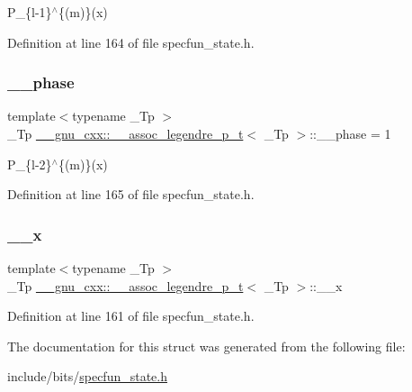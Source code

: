 P\+\_\+\{l-\/1\}$^\wedge$\{(m)\}(x) 



Definition at line 164 of file specfun\+\_\+state.\+h.

\mbox{\label{struct____gnu__cxx_1_1____assoc__legendre__p__t_ae4f6c562515b34a83b19f4998758f754}} 
\subsubsection{\texorpdfstring{\+\_\+\+\_\+phase}{\_\_phase}}
{\footnotesize\ttfamily template$<$typename \+\_\+\+Tp $>$ \\
\+\_\+\+Tp \hyperlink{struct____gnu__cxx_1_1____assoc__legendre__p__t}{\+\_\+\+\_\+gnu\+\_\+cxx\+::\+\_\+\+\_\+assoc\+\_\+legendre\+\_\+p\+\_\+t}$<$ \+\_\+\+Tp $>$\+::\+\_\+\+\_\+phase = 1}



P\+\_\+\{l-\/2\}$^\wedge$\{(m)\}(x) 



Definition at line 165 of file specfun\+\_\+state.\+h.

\mbox{\label{struct____gnu__cxx_1_1____assoc__legendre__p__t_a2de7db5bc670cc446e2a1ca92fd1a4d2}} 
\subsubsection{\texorpdfstring{\+\_\+\+\_\+x}{\_\_x}}
{\footnotesize\ttfamily template$<$typename \+\_\+\+Tp $>$ \\
\+\_\+\+Tp \hyperlink{struct____gnu__cxx_1_1____assoc__legendre__p__t}{\+\_\+\+\_\+gnu\+\_\+cxx\+::\+\_\+\+\_\+assoc\+\_\+legendre\+\_\+p\+\_\+t}$<$ \+\_\+\+Tp $>$\+::\+\_\+\+\_\+x}



Definition at line 161 of file specfun\+\_\+state.\+h.



The documentation for this struct was generated from the following file\+:\begin{DoxyCompactItemize}
\item 
include/bits/\hyperlink{specfun__state_8h}{specfun\+\_\+state.\+h}\end{DoxyCompactItemize}
